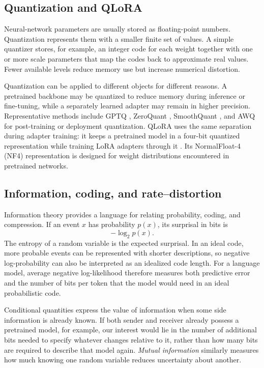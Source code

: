 \subsection{Quantization and QLoRA}

Neural-network parameters are usually stored as floating-point numbers. Quantization represents them with a smaller finite set of values. A simple quantizer stores, for example, an integer code for each weight together with one or more scale parameters that map the codes back to approximate real values. Fewer available levels reduce memory use but increase numerical distortion.

Quantization can be applied to different objects for different reasons. A pretrained backbone may be quantized to reduce memory during inference or fine-tuning, while a separately learned adapter may remain in higher precision. Representative methods include GPTQ \parencite{frantar2023gptq}, ZeroQuant \parencite{yao2022zeroquant}, SmoothQuant \parencite{xiao2023smoothquant}, and AWQ \parencite{lin2024awq} for post-training or deployment quantization. QLoRA uses the same separation during adapter training: it keeps a pretrained model in a four-bit quantized representation while training LoRA adapters through it \parencite{dettmers2023qlora}. Its NormalFloat-4 (NF4) representation is designed for weight distributions encountered in pretrained networks.

\subsection{Information, coding, and rate--distortion}

Information theory provides a language for relating probability, coding, and compression. If an event $x$ has probability $p(x)$, its surprisal in bits is
\begin{equation}
    -\log_2 p(x).
\end{equation}
The entropy of a random variable is the expected surprisal. In an ideal code, more probable events can be represented with shorter descriptions, so negative log-probability can also be interpreted as an idealized code length. For a language model, average negative log-likelihood therefore measures both predictive error and the number of bits per token that the model would need in an ideal probabilistic code.

Conditional quantities express the value of information when some side information is already known. If both sender and receiver already possess a pretrained model, for example, our interest would lie in the number of additional bits needed to specify whatever changes relative to it, rather than how many bits are required to describe that model again. \emph{Mutual information} similarly measures how much knowing one random variable reduces uncertainty about another. 

